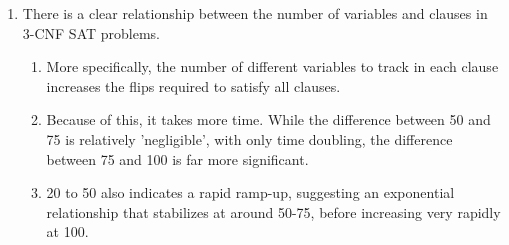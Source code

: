 \documentclass[11pt]{article}
\begin{document}
\begin{enumerate}
\begin{enumerate}
\item There is a clear relationship between the number of variables and clauses in 3-CNF SAT problems.
\begin{enumerate}
\item More specifically, the number of different variables to track in each clause increases the flips required to satisfy all clauses.
\item Because of this, it takes more time. While the difference between 50 and 75 is relatively 'negligible', with only time doubling, the difference between 75 and 100 is far more significant.
\item 20 to 50 also indicates a rapid ramp-up, suggesting an exponential relationship that stabilizes at around 50-75, before increasing very rapidly at 100.
\end{enumerate} 
\end{enumerate}


\end{enumerate}
\end{document}

